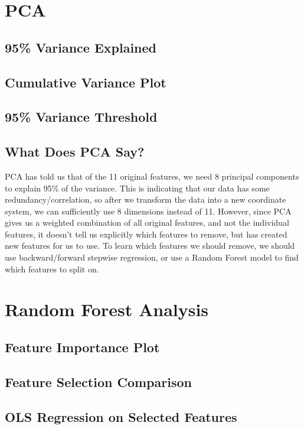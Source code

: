 \documentclass[12pt]{article}
\begin{document}
\section{PCA}

\subsection{95\% Variance Explained}

\subsection{Cumulative Variance Plot}

\subsection{95\% Variance Threshold}

\subsection{What Does PCA Say?}
PCA has told us that of the 11 original features, we need 8 principal components to explain 95\% of the variance. This is indicating that our data has some redundancy/correlation,
so after we transform the data into a new coordinate system, we can sufficiently use 8 dimensions instead of 11. However, since PCA gives us a weighted combination of all original features, and not the individual features,
it doesn't tell us explicitly which features to remove, but has created new features for us to use. To learn which features we should remove, we should use backward/forward stepwise regression, or use a Random Forest model to find which features to split on.

\section{Random Forest Analysis}

\subsection{Feature Importance Plot}

\subsection{Feature Selection Comparison}

\subsection{OLS Regression on Selected Features}
\end{document}

